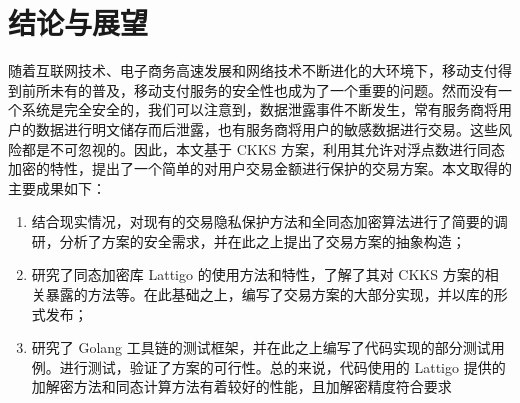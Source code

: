 \chapter{结论与展望}

随着互联网技术、电子商务高速发展和网络技术不断进化的大环境下，移动支付得到前所未有的普及，移动支付服务的安全性也成为了一个重要的问题。然而没有一个系统是完全安全的，我们可以注意到，数据泄露事件不断发生，常有服务商将用户的数据进行明文储存而后泄露，也有服务商将用户的敏感数据进行交易。这些风险都是不可忽视的。因此，本文基于 CKKS 方案，利用其允许对浮点数进行同态加密的特性，提出了一个简单的对用户交易金额进行保护的交易方案。本文取得的主要成果如下：

\begin{enumerate}
    \item 结合现实情况，对现有的交易隐私保护方法和全同态加密算法进行了简要的调研，分析了方案的安全需求，并在此之上提出了交易方案的抽象构造；
    \item 研究了同态加密库 Lattigo 的使用方法和特性，了解了其对 CKKS 方案的相关暴露的方法等。在此基础之上，编写了交易方案的大部分实现，并以库的形式发布；
    \item 研究了 Golang 工具链的测试框架，并在此之上编写了代码实现的部分测试用例。进行测试，验证了方案的可行性。总的来说，代码使用的 Lattigo 提供的加解密方法和同态计算方法有着较好的性能，且加解密精度符合要求
\end{enumerate}
